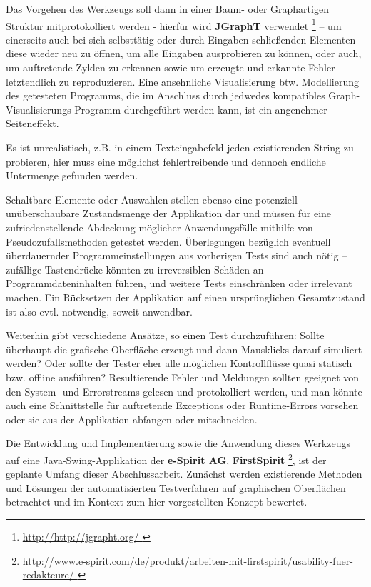 Das Vorgehen des Werkzeugs soll dann in einer Baum- oder Graphartigen
Struktur mitprotokolliert werden - hierfür wird \textbf{JGraphT} verwendet \footnote{\url{ http://http://jgrapht.org/ }} --
um einerseits auch bei sich selbsttätig oder durch Eingaben schließenden Elementen diese wieder
neu zu öffnen, um alle Eingaben ausprobieren zu können, oder auch, um auftretende Zyklen 
zu erkennen sowie um erzeugte und erkannte Fehler letztendlich zu reproduzieren.
Eine ansehnliche Visualisierung btw. Modellierung des getesteten Programms, die
im Anschluss durch jedwedes kompatibles Graph-Visualisierungs-Programm
durchgeführt werden kann, ist ein angenehmer Seiteneffekt.

Es ist unrealistisch, z.B. in
einem Texteingabefeld jeden existierenden String zu probieren, hier muss eine möglichst
fehlertreibende und dennoch endliche Untermenge gefunden werden.

Schaltbare Elemente oder Auswahlen stellen ebenso
eine potenziell unüberschaubare Zustandsmenge der Applikation dar und müssen für eine
zufriedenstellende Abdeckung möglicher Anwendungsfälle mithilfe von
Pseudozufallsmethoden getestet werden. Überlegungen bezüglich eventuell überdauernder Programmeinstellungen
aus vorherigen Tests sind auch nötig -- zufällige Tastendrücke könnten zu irreversiblen Schäden an
Programmdateninhalten führen, und weitere Tests einschränken oder irrelevant machen. Ein Rücksetzen
der Applikation auf einen ursprünglichen Gesamtzustand ist also evtl. notwendig, soweit anwendbar.
 
Weiterhin gibt verschiedene Ansätze, so einen Test durchzuführen: Sollte überhaupt die
grafische Oberfläche erzeugt und dann Mausklicks darauf simuliert werden? Oder sollte der
Tester eher alle möglichen Kontrollflüsse quasi statisch bzw. offline ausführen? Resultierende
Fehler und Meldungen sollten geeignet von den System- und Errorstreams gelesen und
protokolliert werden, und man könnte auch eine Schnittstelle für auftretende Exceptions oder
Runtime-Errors vorsehen oder sie aus der Applikation abfangen oder mitschneiden. 
 
Die Entwicklung und Implementierung sowie die Anwendung dieses Werkzeugs auf eine Java-Swing-Applikation
der \textbf{e-Spirit AG}, \textbf{FirstSpirit} 
\footnote{\url{ http://www.e-spirit.com/de/produkt/arbeiten-mit-firstspirit/usability-fuer-redakteure/ }}, 
ist der geplante 
Umfang dieser Abschlussarbeit. Zunächst werden existierende Methoden und Lösungen der automatisierten
Testverfahren auf graphischen Oberflächen betrachtet und im Kontext zum hier vorgestellten Konzept
bewertet.

